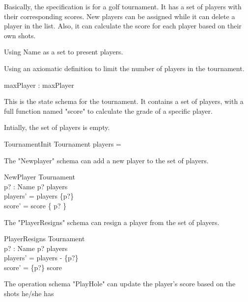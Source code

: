 \documentclass{llncs}
\begin{document}
Basically, the specification is for a golf tournament. It has a set of players with their corresponding 
scores. New players can be assigned while it can delete a player in the list. Also, it can calculate 
the score for each player based on their own shots.


Using Name as a set to present players.
\begin{zed}
[Name]
\end{zed}
Using an axiomatic definition to limit the number of players in the tournament.
\begin{axdef}
maxPlayer : \nat
\where maxPlayer 
\end{axdef}
This is the state schema for the tournament. It contains a set of players, with a full function 
named "score" to calculate the grade of a specific player.

Intially, the set of players is empty.
\begin{schema}{TournamentInit}
Tournament
\where players = \emptyset
\end{schema}

The "Newplayer" schema can add a new player to the set of players.
\begin{schema}{NewPlayer}
\Delta Tournament \\
p? : Name
\where p? \notin players \\
players' = players \cup \{p?\} \\
score' = score \cup \{ p?  \}
\end{schema}

The "PlayerResigns" schema can resign a player from the set of players.
\begin{schema}{PlayerResigns}
\Delta Tournament \\
p? : Name
\where p? \in players\\
players' = players - \{p?\} \\
score' = \{p?\} \ndres score
\end{schema}

The operation schema "PlayHole" can update the player's score based on the shots he/she has
\end{document}
